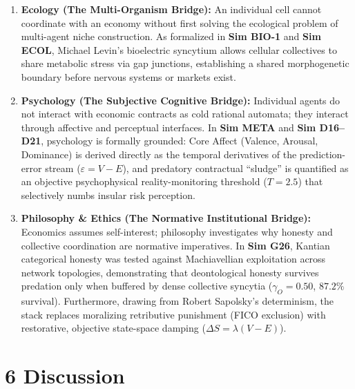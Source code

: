 \documentclass[
]{article}
\providecommand{\tightlist}{%
  \setlength{\itemsep}{0pt}\setlength{\parskip}{0pt}}
\begin{document}
\begin{enumerate}
\def\labelenumi{\arabic{enumi}.}
\tightlist
\item
  \textbf{Ecology (The Multi-Organism Bridge):} An individual cell
  cannot coordinate with an economy without first solving the ecological
  problem of multi-agent niche construction. As formalized in
  \textbf{Sim BIO-1} and \textbf{Sim ECOL}, Michael Levin's bioelectric
  syncytium allows cellular collectives to share metabolic stress via
  gap junctions, establishing a shared morphogenetic boundary before
  nervous systems or markets exist.
\item
  \textbf{Psychology (The Subjective Cognitive Bridge):} Individual
  agents do not interact with economic contracts as cold rational
  automata; they interact through affective and perceptual interfaces.
  In \textbf{Sim META} and \textbf{Sim D16--D21}, psychology is formally
  grounded: Core Affect (Valence, Arousal, Dominance) is derived
  directly as the temporal derivatives of the prediction-error stream
  (\(\varepsilon = V - E\)), and predatory contractual ``sludge'' is
  quantified as an objective psychophysical reality-monitoring threshold
  (\(T = 2.5\)) that selectively numbs insular risk perception.
\item
  \textbf{Philosophy \& Ethics (The Normative Institutional Bridge):}
  Economics assumes self-interest; philosophy investigates why honesty
  and collective coordination are normative imperatives. In \textbf{Sim
  G26}, Kantian categorical honesty was tested against Machiavellian
  exploitation across network topologies, demonstrating that
  deontological honesty survives predation only when buffered by dense
  collective syncytia (\(\gamma_O = 0.50\), \(87.2\%\) survival).
  Furthermore, drawing from Robert Sapolsky's determinism, the stack
  replaces moralizing retributive punishment (FICO exclusion) with
  restorative, objective state-space damping
  (\(\Delta S = \lambda(V - E)\)).
\end{enumerate}

\section{6 Discussion}\label{discussion}
\end{document}
